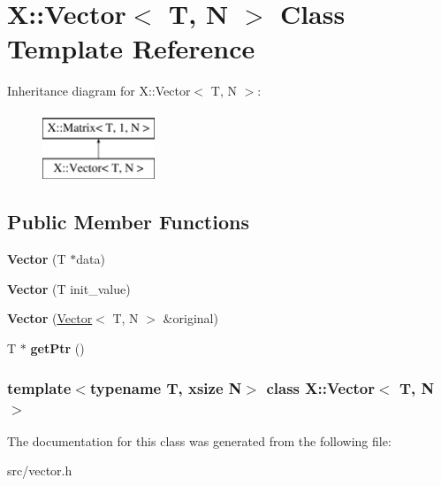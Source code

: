 \hypertarget{class_x_1_1_vector}{\section{X\-:\-:Vector$<$ T, N $>$ Class Template Reference}
\label{class_x_1_1_vector}
}
Inheritance diagram for X\-:\-:Vector$<$ T, N $>$\-:\begin{figure}[H]
\begin{center}
\leavevmode
\includegraphics[height=2.000000cm]{class_x_1_1_vector}
\end{center}
\end{figure}
\subsection*{Public Member Functions}
\begin{DoxyCompactItemize}
\item 
\hypertarget{class_x_1_1_vector_a8ab40898cfe1b88e72eb65fdbf02e65c}{{\bfseries Vector} (T $\ast$data)}\label{class_x_1_1_vector_a8ab40898cfe1b88e72eb65fdbf02e65c}

\item 
\hypertarget{class_x_1_1_vector_a957893ba7708b81325d1815622f25f11}{{\bfseries Vector} (T init\-\_\-value)}\label{class_x_1_1_vector_a957893ba7708b81325d1815622f25f11}

\item 
\hypertarget{class_x_1_1_vector_ac5e9e3616cbd335f51d78f414d90b73d}{{\bfseries Vector} (\hyperlink{class_x_1_1_vector}{Vector}$<$ T, N $>$ \&original)}\label{class_x_1_1_vector_ac5e9e3616cbd335f51d78f414d90b73d}

\item 
\hypertarget{class_x_1_1_vector_a10325386231775ef382c19a413f45cb6}{T $\ast$ {\bfseries get\-Ptr} ()}\label{class_x_1_1_vector_a10325386231775ef382c19a413f45cb6}

\end{DoxyCompactItemize}
\subsubsection*{template$<$typename T, xsize N$>$ class X\-::\-Vector$<$ T, N $>$}



The documentation for this class was generated from the following file\-:\begin{DoxyCompactItemize}
\item 
src/vector.\-h\end{DoxyCompactItemize}
